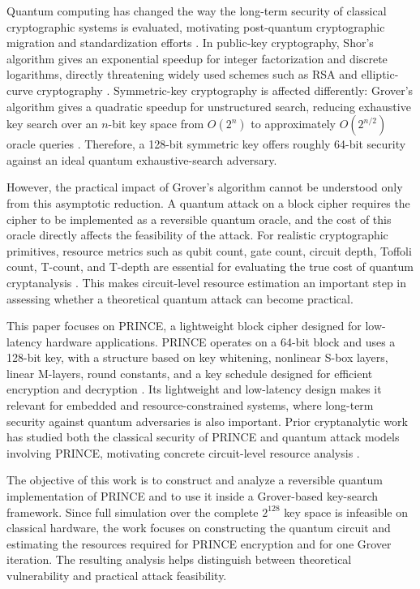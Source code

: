 \documentclass[11pt,a4paper]{article}
\begin{document}
Quantum computing has changed the way the long-term security of classical cryptographic systems is evaluated, motivating post-quantum cryptographic migration and standardization efforts \cite{bernstein2017postquantum,alagic2022status}. In public-key cryptography, Shor's algorithm gives an exponential speedup for integer factorization and discrete logarithms, directly threatening widely used schemes such as RSA and elliptic-curve cryptography \cite{shor1994algorithms,roetteler2017ecc,gidney2019factor}. Symmetric-key cryptography is affected differently: Grover's algorithm gives a quadratic speedup for unstructured search, reducing exhaustive key search over an $n$-bit key space from $O(2^n)$ to approximately $O(2^{n/2})$ oracle queries \cite{grover1996fast}. Therefore, a 128-bit symmetric key offers roughly 64-bit security against an ideal quantum exhaustive-search adversary.

However, the practical impact of Grover's algorithm cannot be understood only from this asymptotic reduction. A quantum attack on a block cipher requires the cipher to be implemented as a reversible quantum oracle, and the cost of this oracle directly affects the feasibility of the attack. For realistic cryptographic primitives, resource metrics such as qubit count, gate count, circuit depth, Toffoli count, T-count, and T-depth are essential for evaluating the true cost of quantum cryptanalysis \cite{grassl2016applying,kim2018timespace}. This makes circuit-level resource estimation an important step in assessing whether a theoretical quantum attack can become practical.

This paper focuses on PRINCE, a lightweight block cipher designed for low-latency hardware applications. PRINCE operates on a 64-bit block and uses a 128-bit key, with a structure based on key whitening, nonlinear S-box layers, linear M-layers, round constants, and a key schedule designed for efficient encryption and decryption \cite{borghoff2012prince}. Its lightweight and low-latency design makes it relevant for embedded and resource-constrained systems, where long-term security against quantum adversaries is also important. Prior cryptanalytic work has studied both the classical security of PRINCE and quantum attack models involving PRINCE, motivating concrete circuit-level resource analysis \cite{jean2013security,cai2023quantum}.

The objective of this work is to construct and analyze a reversible quantum implementation of PRINCE and to use it inside a Grover-based key-search framework. Since full simulation over the complete $2^{128}$ key space is infeasible on classical hardware, the work focuses on constructing the quantum circuit and estimating the resources required for PRINCE encryption and for one Grover iteration. The resulting analysis helps distinguish between theoretical vulnerability and practical attack feasibility.
\end{document}
